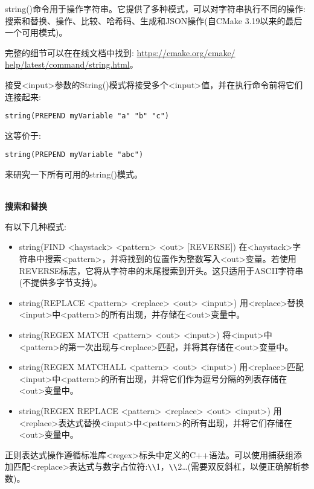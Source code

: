 string()命令用于操作字符串。它提供了多种模式，可以对字符串执行不同的操作:搜索和替换、操作、比较、哈希码、生成和JSON操作(自CMake 3.19以来的最后一个可用模式)。

完整的细节可以在在线文档中找到: \url{https://cmake.org/cmake/ help/latest/command/string.html}。

接受<input>参数的String()模式将接受多个<input>值，并在执行命令前将它们连接起来:

\begin{lstlisting}[style=styleCMake]
string(PREPEND myVariable "a" "b" "c")
\end{lstlisting}

这等价于:

\begin{lstlisting}[style=styleCMake]
string(PREPEND myVariable "abc")
\end{lstlisting}

来研究一下所有可用的string()模式。

\hspace*{\fill} \\ %
\noindent
\textbf{搜索和替换}

有以下几种模式:

\begin{itemize}
\item 
string(FIND <haystack> <pattern> <out> [REVERSE]) 在<haystack>字符串中搜索<pattern>，并将找到的位置作为整数写入<out>变量。若使用REVERSE标志，它将从字符串的末尾搜索到开头。这只适用于ASCII字符串(不提供多字节支持)。

\item 
string(REPLACE <pattern> <replace> <out> <input>) 用<replace>替换<input>中<pattern>的所有出现，并存储在<out>变量中。

\item 
string(REGEX MATCH <pattern> <out> <input>) 将<input>中<pattern>的第一次出现与<replace>匹配，并将其存储在<out>变量中。

\item 
string(REGEX MATCHALL <pattern> <out> <input>) 用<replace>匹配<input>中<pattern>的所有出现，并将它们作为逗号分隔的列表存储在<out>变量中。

\item
string(REGEX REPLACE <pattern> <replace> <out> <input>) 用<replace>表达式替换<input>中<pattern>的所有出现，并将它们存储在<out>变量中。
\end{itemize}

正则表达式操作遵循标准库<regex>标头中定义的C++语法。可以使用捕获组添加匹配<replace>表达式与数字占位符:\verb|\|\verb|\|1，\verb|\|\verb|\|2…(需要双反斜杠，以便正确解析参数)。


